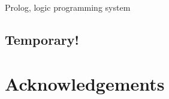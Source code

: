 \documentclass{tlp}
\begin{document}
\begin{keywords}
Prolog, logic programming system
\end{keywords}

\newpage
\subsection*{Temporary!}
\tableofcontents
\newpage









\section*{Acknowledgements}


\end{document}
